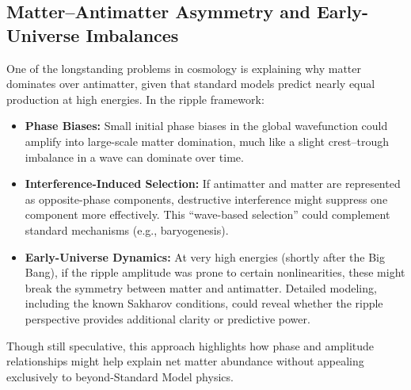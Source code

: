 \documentclass[11pt]{article}
\begin{document}
\subsection{Matter--Antimatter Asymmetry and Early-Universe Imbalances}
\label{subsec:matter-antimatter-imbalance}
One of the longstanding problems in cosmology is explaining why matter 
dominates over antimatter, given that standard models predict nearly 
equal production at high energies. In the ripple framework:
\begin{itemize}
  \item \textbf{Phase Biases:} Small initial phase biases in the global 
        wavefunction could amplify into large-scale matter domination, 
        much like a slight crest--trough imbalance in a wave can dominate 
        over time.
  \item \textbf{Interference-Induced Selection:} If antimatter and matter 
        are represented as opposite-phase components, destructive interference 
        might suppress one component more effectively. This “wave-based 
        selection” could complement standard mechanisms (e.g., baryogenesis).
  \item \textbf{Early-Universe Dynamics:} At very high energies (shortly 
        after the Big Bang), if the ripple amplitude was prone to certain 
        nonlinearities, these might break the symmetry between matter 
        and antimatter. Detailed modeling, including the known Sakharov 
        conditions, could reveal whether the ripple perspective provides 
        additional clarity or predictive power.
\end{itemize}
Though still speculative, this approach highlights how phase and amplitude 
relationships might help explain net matter abundance without appealing 
exclusively to beyond-Standard Model physics.
\end{document}
